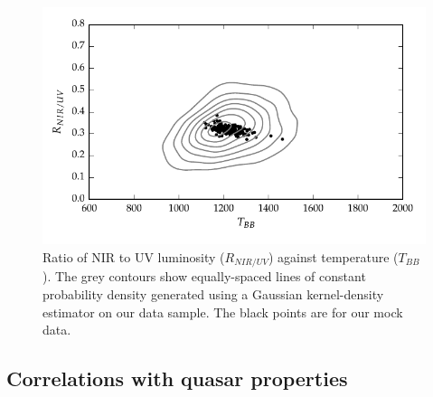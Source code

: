 \begin{figure}
  \centering
  \includegraphics[width=\textwidth]{figures/chapter05/ratio_tbb_contours.pdf}
  \caption{Ratio of NIR to UV luminosity ($R_{NIR/UV}$) against temperature ($T_{BB}$). The grey contours show equally-spaced lines of constant probability density generated using a Gaussian kernel-density estimator on our data sample. The black points are for our mock data.}
  \label{fig:ratio_tbb_contours}
\end{figure}

\subsection{Correlations with quasar properties}

